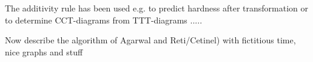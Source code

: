 The additivity rule has been used e.g. to predict hardness after transformation \cite{pumphrey_inter-relation_1948} or to determine CCT-diagrams from TTT-diagrams \cite{tzitzelkov_mathematische_1974}.....


Now describe the algorithm of Agarwal and Reti/Cetinel) with fictitious time, nice graphs and stuff